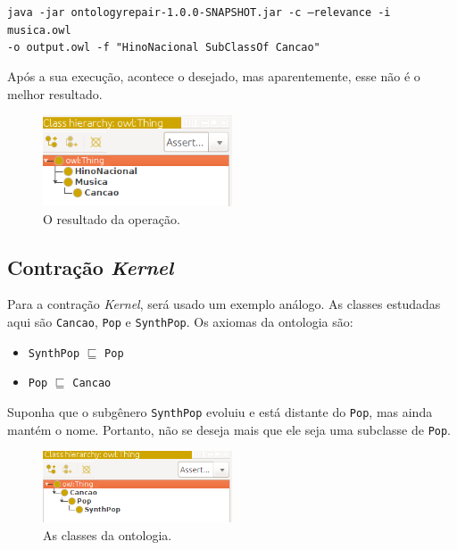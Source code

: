 \begin{small}
	\texttt{java -jar ontologyrepair-1.0.0-SNAPSHOT.jar -c --relevance -i musica.owl \\ -o output.owl -f "HinoNacional SubClassOf Cancao"}
\end{small}

Após a sua execução, acontece o desejado, mas aparentemente, esse não é o melhor resultado.

\begin{figure}[H]
	\centering
	\includegraphics[width=0.5\textwidth]{Capitulos/Implementacao/cpm2.png}
	\caption{O resultado da operação.}
\end{figure}

\subsection{Contração \textit{Kernel}}

Para a contração \textit{Kernel}, será usado um exemplo análogo. As classes estudadas aqui são \texttt{Cancao}, \texttt{Pop} e \texttt{SynthPop}. Os axiomas da ontologia são:

\begin{itemize}
	\item \texttt{SynthPop} $ \sqsubseteq $ \texttt{Pop}
	\item \texttt{Pop} $ \sqsubseteq $ \texttt{Cancao}
\end{itemize}

Suponha que o subgênero \texttt{SynthPop} evoluiu e está distante do \texttt{Pop}, mas ainda mantém o nome. Portanto, não se deseja mais que ele seja uma subclasse de \texttt{Pop}.

\begin{figure}[H]
	\centering
	\includegraphics[width=0.5\textwidth]{Capitulos/Implementacao/ck1.png}
	\caption{As classes da ontologia.}
\end{figure}

